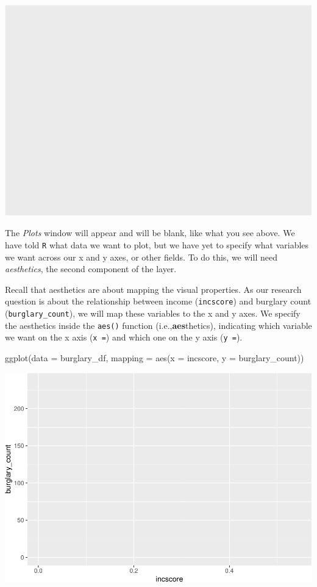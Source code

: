 \documentclass[
]{book}
\newenvironment{Shaded}{\begin{snugshade}}{\end{snugshade}}
\newcommand{\AttributeTok}[1]{\textcolor[rgb]{0.77,0.63,0.00}{#1}}
\newcommand{\FunctionTok}[1]{\textcolor[rgb]{0.00,0.00,0.00}{#1}}
\newcommand{\NormalTok}[1]{#1}
\begin{document}
\includegraphics{03-data-visualisation_files/figure-latex/unnamed-chunk-4-1.pdf}

The \emph{Plots} window will appear and will be blank, like what you see above. We have told \texttt{R} what data we want to plot, but we have yet to specify what variables we want across our x and y axes, or other fields. To do this, we will need \emph{aesthetics}, the second component of the layer.

Recall that aesthetics are about mapping the visual properties. As our research question is about the relationship between income (\texttt{incscore}) and burglary count (\texttt{burglary\_count}), we will map these variables to the x and y axes. We specify the aesthetics inside the \texttt{aes()} function (i.e.,\textbf{aes}thetics), indicating which variable we want on the x axis (\texttt{x\ =}) and which one on the y axis (\texttt{y\ =}).

\begin{Shaded}
\begin{Highlighting}[]
\FunctionTok{ggplot}\NormalTok{(}\AttributeTok{data =}\NormalTok{ burglary\_df, }\AttributeTok{mapping =} \FunctionTok{aes}\NormalTok{(}\AttributeTok{x =}\NormalTok{ incscore, }\AttributeTok{y =}\NormalTok{ burglary\_count))}
\end{Highlighting}
\end{Shaded}

\includegraphics{03-data-visualisation_files/figure-latex/unnamed-chunk-5-1.pdf}
\end{document}
